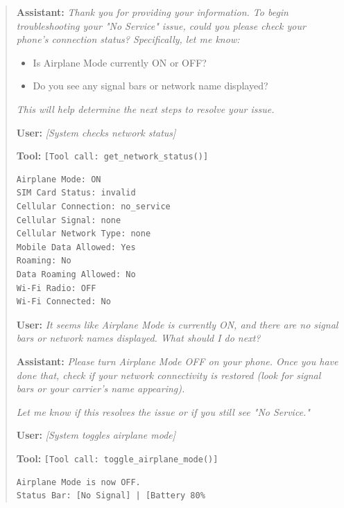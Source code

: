 \begin{quote}
\vspace{0.5em}
\noindent\textbf{Assistant:} \textit{Thank you for providing your information. To begin troubleshooting your "No Service" issue, could you please check your phone's connection status? Specifically, let me know:}
\begin{itemize}[leftmargin=*]
\item Is Airplane Mode currently ON or OFF?
\item Do you see any signal bars or network name displayed?
\end{itemize}
\textit{This will help determine the next steps to resolve your issue.}

\vspace{0.5em}
\noindent\textbf{User:} \textit{[System checks network status]}

\vspace{0.5em}
\noindent\textbf{Tool:} \texttt{[Tool call: get\_network\_status()]}

\begin{verbatim}
Airplane Mode: ON
SIM Card Status: invalid
Cellular Connection: no_service
Cellular Signal: none
Cellular Network Type: none
Mobile Data Allowed: Yes
Roaming: No
Data Roaming Allowed: No
Wi-Fi Radio: OFF
Wi-Fi Connected: No
\end{verbatim}

\vspace{0.5em}
\noindent\textbf{User:} \textit{It seems like Airplane Mode is currently ON, and there are no signal bars or network names displayed. What should I do next?}

\vspace{0.5em}
\noindent\textbf{Assistant:} \textit{Please turn Airplane Mode OFF on your phone. Once you have done that, check if your network connectivity is restored (look for signal bars or your carrier's name appearing).}

\textit{Let me know if this resolves the issue or if you still see "No Service."}

\vspace{0.5em}
\noindent\textbf{User:} \textit{[System toggles airplane mode]}

\vspace{0.5em}
\noindent\textbf{Tool:} \texttt{[Tool call: toggle\_airplane\_mode()]}

\begin{verbatim}
Airplane Mode is now OFF.
Status Bar: [No Signal] | [Battery 80%
\end{verbatim}


\end{quote}
